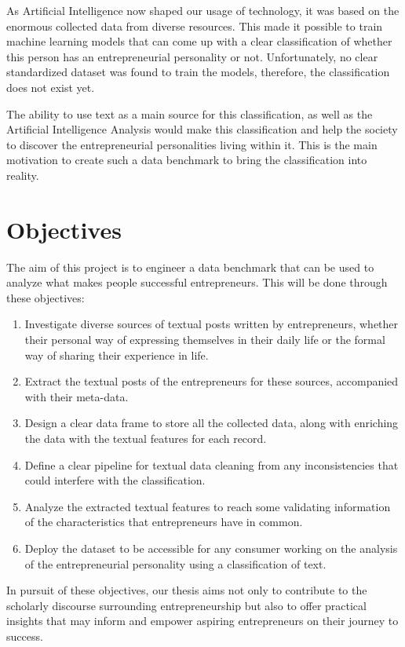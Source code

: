 As Artificial Intelligence now shaped our usage of technology, it was based on the enormous collected data from diverse resources. This made it possible to train machine learning models that can come up with a clear classification of whether this person has an entrepreneurial personality or not. Unfortunately, no clear standardized dataset was found to train the models, therefore, the classification does not exist yet.

The ability to use text as a main source for this classification, as well as the Artificial Intelligence Analysis would make this classification and help the society to discover the entrepreneurial personalities living within it. This is the main motivation to create such a data benchmark to bring the classification into reality.

\section{Objectives}
The aim of this project is to engineer a data benchmark that can be used to analyze what makes people successful entrepreneurs. This will be done through these objectives:

\begin{enumerate}
\item Investigate diverse sources of textual posts written by entrepreneurs, whether their personal way of expressing themselves in their daily life or the formal way of sharing their experience in life.
\item Extract the textual posts of the entrepreneurs for these sources, accompanied with their meta-data.
\item Design a clear data frame to store all the collected data, along with enriching the data with the textual features for each record.
\item Define a clear pipeline for textual data cleaning from any inconsistencies that could interfere with the classification.
\item Analyze the extracted textual features to reach some validating information of the characteristics that entrepreneurs have in common.
\item Deploy the dataset to be accessible for any consumer working on the analysis of the entrepreneurial personality using a classification of text.
\end{enumerate}

In pursuit of these objectives, our thesis aims not only to contribute to the scholarly discourse surrounding entrepreneurship but also to offer practical insights that may inform and empower aspiring entrepreneurs on their journey to success.


